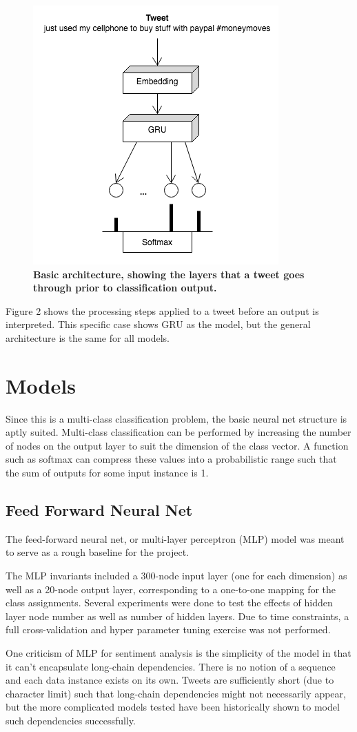 \documentclass[11pt,a4paper]{article}
\begin{document}
	\begin{figure}[H]
		\centering\includegraphics[scale=0.7]{modelgru} 
		\caption{\textbf{ Basic architecture, showing the layers that a tweet goes through prior to classification output.}}
	\end{figure}
	
	Figure 2 shows the processing steps applied to a tweet before an output is interpreted. This specific case shows GRU as the model, but the general architecture is the same for all models.
	
	\section{Models}
	Since this is a multi-class classification problem, the basic neural net structure is aptly suited. Multi-class classification can be performed by increasing the number of nodes on the output layer to suit the dimension of the class vector. A function such as softmax can compress these values into a probabilistic range such that the sum of outputs for some input instance is 1.
	\subsection{Feed Forward Neural Net}
	 The feed-forward neural net, or multi-layer perceptron (MLP) model was meant to serve as a rough baseline for the project.
	\par
	The MLP invariants included a 300-node input layer (one for each dimension) as well as a 20-node output layer, corresponding to a one-to-one mapping for the class assignments. Several experiments were done to test the effects of hidden layer node number as well as number of hidden layers. Due to time constraints, a full cross-validation and hyper parameter tuning exercise was not performed. 
	\par
	One criticism of MLP for sentiment analysis is the simplicity of the model in that it can’t encapsulate long-chain dependencies. There is no notion of a sequence and each data instance exists on its own. Tweets are sufficiently short (due to character limit) such that long-chain dependencies might not necessarily appear, but the more complicated models tested have been historically shown to model such dependencies successfully. 
	
\end{document}
